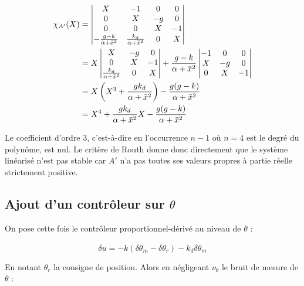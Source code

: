 \documentclass[10pt]{article}
\begin{document}
\begin{align}
	\chi_{A'} (X) &=
	\begin{vmatrix}
		X & -1 & 0 & 0 \\
		0 & X & -g & 0 \\
		0 & 0 & X & -1 \\
		- \frac{g - k}{\alpha + \bar x^2} & \frac{k_d}{\alpha + \bar x^2} & 0 & X
	\end{vmatrix} \notag \\
	&= X \begin{vmatrix}
		X & -g & 0 \\
		0 & X & -1 \\
		\frac{k_d}{\alpha + \bar x^2} & 0 & X
	\end{vmatrix} + 
	\frac{g - k}{\alpha + \bar x^2} \begin{vmatrix}
		-1 & 0 & 0 \\
		X & -g & 0 \\
		0 & X & -1
	\end{vmatrix} \notag \\
	&= X \left( X^3 + \frac{g k_d}{\alpha + \bar x^2} \right) - \frac{g (g - k)}{\alpha + \bar x^2} \notag \\
	&= X^4 + \frac{g k_d}{\alpha + \bar x^2} X - \frac{g (g - k)}{\alpha + \bar x^2} \notag
\end{align}

\noindent Le coefficient d'ordre $3$, c'est-à-dire en l'occurrence $n - 1$ où $n = 4$ est le degré du polynôme,
est nul. Le critère de Routh donne donc directement que le système linéarisé n'est pas stable car $A'$
n'a pas toutes ses valeurs propres à partie réelle strictement positive.

\subsection*{Ajout d'un contrôleur sur $\theta$}

On pose cette fois le contrôleur proportionnel-dérivé au niveau de $\theta$ :

\[
	\delta u = - k ( \delta \theta_m - \delta \theta_r ) - k_d \delta \dot \theta_m
\]

\noindent En notant $\theta_r$ la consigne de position. Alors en négligeant $\nu_{\theta}$ le bruit de mesure de $\theta$ :
\end{document}
